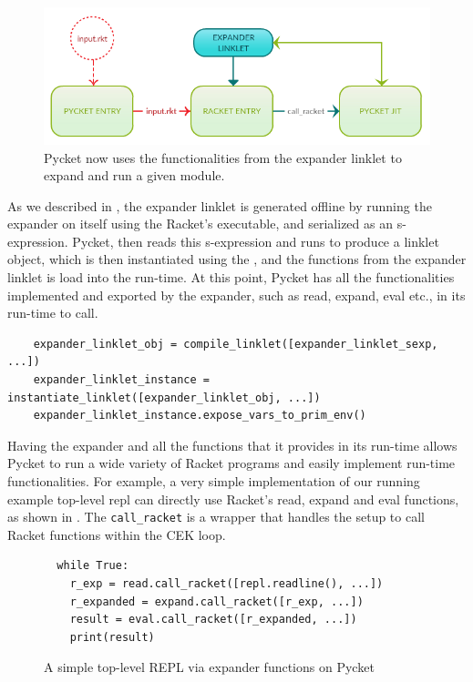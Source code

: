 \begin{figure}[h!]
  \centering
\includegraphics[scale=0.3]{img/new-pycket}
\caption{Pycket now uses the functionalities from the expander linklet to expand and run a given module.}
\label{fig:new-pycket}
\end{figure}

As we described in , the expander linklet
is generated offline by running the expander on itself using the
Racket's executable, and serialized as an s-expression. Pycket, then
reads this s-expression and runs  to produce a
linklet object, which is then instantiated using the
, and the functions from the expander
linklet is load into the run-time. At this point, Pycket has all the
functionalities implemented and exported by the expander, such as
read, expand, eval etc., in its run-time to call.

\begin{verbatim}
    expander_linklet_obj = compile_linklet([expander_linklet_sexp, ...])
    expander_linklet_instance = instantiate_linklet([expander_linklet_obj, ...])
    expander_linklet_instance.expose_vars_to_prim_env()
\end{verbatim}

Having the expander and all the functions that it provides in its
run-time allows Pycket to run a wide variety of Racket programs and
easily implement run-time functionalities. For example, a very simple
implementation of our running example top-level repl can directly use
Racket's read, expand and eval functions, as shown in
. The \verb|call_racket| is a wrapper that
handles the setup to call Racket functions within the CEK loop.

\begin{figure}
  \vspace{-0.6cm}
\begin{verbatim}
  while True:
    r_exp = read.call_racket([repl.readline(), ...])
    r_expanded = expand.call_racket([r_exp, ...])
    result = eval.call_racket([r_expanded, ...])
    print(result)
\end{verbatim}
\caption{A simple top-level REPL via expander functions on Pycket}
\label{fig:repl-rpython}
\end{figure}

